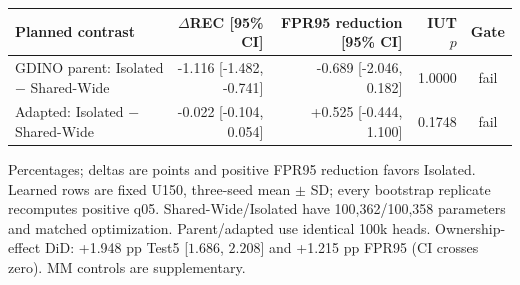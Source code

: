 \begin{table}[t]
\begin{tabular}{lrrrc}
\toprule
Planned contrast & $\Delta$REC [95\% CI] & FPR95 reduction [95\% CI] & IUT $p$ & Gate \\
\midrule
GDINO parent: Isolated $-$ Shared-Wide & -1.116 [-1.482, -0.741] & -0.689 [-2.046, 0.182] & 1.0000 & fail \\
Adapted: Isolated $-$ Shared-Wide & -0.022 [-0.104, 0.054] & +0.525 [-0.444, 1.100] & 0.1748 & fail \\
\bottomrule
\end{tabular}
\vspace{2pt}
\parbox{0.98\textwidth}{\footnotesize Percentages; deltas are points and
positive FPR95 reduction favors Isolated. Learned rows are fixed U150,
three-seed mean $\pm$ SD; every bootstrap replicate recomputes positive q05.
Shared-Wide/Isolated have 100,362/100,358 parameters and matched optimization.
Parent/adapted use identical 100k heads.  Ownership-effect DiD:
+1.948 pp Test5
[$1.686$,
$2.208$] and
+1.215 pp FPR95
(CI crosses zero). MM controls are supplementary.}
\end{table}
